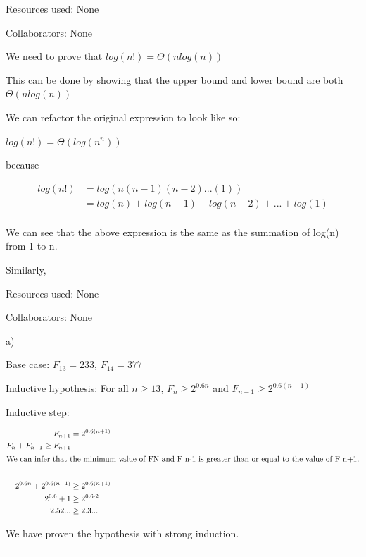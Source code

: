 \documentclass[11pt,largemargins]{homework}
\begin{document}
\maketitle

\newpage
\question
Resources used: None

Collaborators: None

We need to prove that $log(n!) = \Theta(nlog(n))$

This can be done by showing that the upper bound and lower bound are both \(\Theta(nlog(n))\)

We can refactor the original expression to look like so:

$log(n!) = \Theta(log(n^n))$

because 

\begin{align*}
  log(n!) &= log(n(n - 1)(n - 2)...(1)) \\
  &= log(n) + log(n - 1) + log(n - 2) + ... + log(1) \\
\end{align*}

We can see that the above expression is the same as the summation of log(n) from 1 to n.

Similarly, 

\newpage
\question
Resources used: None

Collaborators: None

a)

Base case: $F_13 = 233$, $F_14 = 377$

Inductive hypothesis: For all $n \geq 13$, $F_n \geq 2^{0.6n}$ and $F_{n - 1} \geq 2^{0.6(n - 1)}$

Inductive step:

\begin{align*}
  F_{n + 1} &= 2^{0.6(n + 1)} \\
  F_n + F_{n - 1} \geq F_{n + 1} \\
  \intertext{We can infer that the minimum value of FN and F n-1 is greater than or equal to the value of F n+1.} \\
  2^{0.6n} + 2^{0.6(n - 1)} &\geq 2^{0.6(n + 1)} \\
  2^{0.6} + 1 &\geq 2^{0.6 \cdot 2} \\
  2.52... &\geq 2.3... \\
\end{align*}

We have proven the hypothesis with strong induction.
\vspace{5mm}
\hrule
\vspace{5mm}
\end{document}
